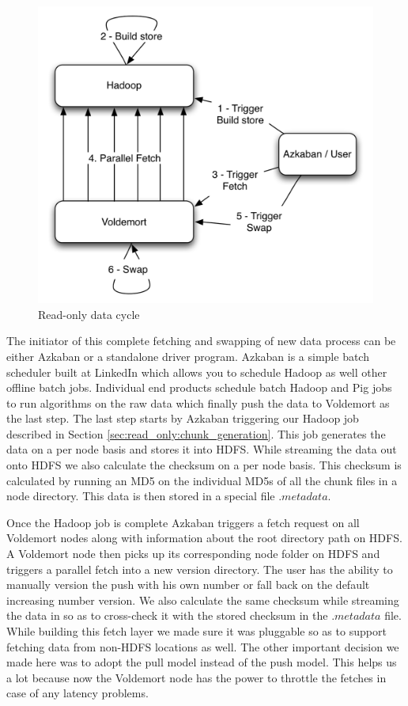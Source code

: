 \documentclass[10pt,twocolumn,preprint,natbib,authoryear]{sigplanconf}
\begin{document}
\begin{figure}
  \centering
    \includegraphics[scale=0.60]{cycle.png}
  \caption{Read-only data cycle}
  \label{cycle}
\end{figure}

The initiator of this complete fetching and swapping of new data process can be either Azkaban or a standalone driver program. Azkaban\cite{Azkaban} is a simple batch scheduler built at LinkedIn which allows you to schedule Hadoop as well other offline batch jobs. Individual end products schedule batch Hadoop and Pig jobs to run algorithms on the raw data which finally push the data to Voldemort as the last step. The last step starts by Azkaban triggering our Hadoop job described in Section \ref{sec:read_only:chunk_generation}. This job generates the data on a per node basis and stores it into HDFS. While streaming the data out onto HDFS we also calculate the checksum on a per node basis. This checksum is calculated by running an MD5 on the individual MD5s of all the chunk files in a node directory. This data is then stored in a special file $.metadata$. 

Once the Hadoop job is complete Azkaban triggers a fetch request on all Voldemort nodes along with information about the root directory path on HDFS. A Voldemort node then picks up its corresponding node folder on HDFS and triggers a parallel fetch into a new version directory. The user has the ability to manually version the push with his own number or fall back on the default increasing number version. We also calculate the same checksum while streaming the data in so as to cross-check it with the stored checksum in the $.metadata$ file. While building this fetch layer we made sure it was pluggable so as to support fetching data from non-HDFS locations as well. The other important decision we made here was to adopt the pull model instead of the push model. This helps us a lot because now the Voldemort node has the power to throttle the fetches in case of any latency problems. 
\end{document}
